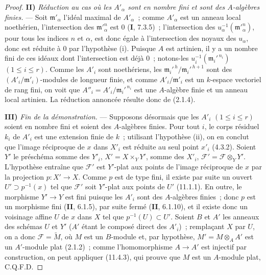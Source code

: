 \begin{proof}
\medskip
\noindent\textbf{II)} \emph{Réduction au cas où les $A'_\alpha$ sont en nombre
fini et sont des $A$-algèbres finies.} --- Soit $\mathfrak m'_\alpha$ l'idéal
maximal de $A'_\alpha$~; comme $A'_\alpha$ est un anneau local noethérien,
l'intersection des $\mathfrak m'^n_\alpha$ est $0$ (\textbf I, 7.3.5)~;
l'intersection des $u_\alpha^{-1}(\mathfrak m'^n_\alpha)$, pour tous les indices
$n$ et $\alpha$, est donc égale à l'intersection des noyaux des $u_\alpha$, donc
est réduite à $0$ par l'hypothèse (i). Puisque $A$ est artinien, il y a un nombre
fini de ces idéaux dont l'intersection est déjà $0$~; notons-les
$u_i^{-1}(\mathfrak m_i'^{\,n_i})$ $(1\leq i\leq r)$. Comme les $A'_i$ sont
noethériens, les $\mathfrak m_i'^{\,h}/\mathfrak m_i'^{\,h+1}$ sont des
$(A'_i/\mathfrak m'_i)$-modules de longueur finie, et comme
$A'_i/\mathfrak m'_i$ est un $k$-espace vectoriel de rang fini, on voit que
$A''_i=A'_i/\mathfrak m_i'^{\,n_i}$ est une $A$-algèbre finie et un anneau local
artinien. La réduction annoncée résulte donc de (2.1.4).

\medskip
\noindent\textbf{III)} \emph{Fin de la démonstration.} --- Supposons désormais
que les $A'_i$ $(1\leq i\leq r)$ soient en nombre fini et soient des
$A$-algèbres finies. Pour tout $i$, le corps résiduel $k_i$ de $A'_i$ est une
extension finie de $k$~; utilisant l'hypothèse (ii), on en conclut que l'image
réciproque de $x$ dans $X'_i$ est réduite au seul point $x'_i$ (4.3.2). Soient
$Y'$ le préschéma somme des $Y'_i$, $X'=X\times_Y Y'$, somme des $X'_i$,
$\mathcal F'=\mathcal F\otimes_Y Y'$. L'hypothèse entraîne que
$\mathcal F'$ est $Y'$-plat aux points de l'image réciproque de $x$ par la
projection $p:X'\to X$. Comme $p$ est de type fini, il existe par suite un
ouvert $U'\supset p^{-1}(x)$ tel que $\mathcal F'$ soit $Y'$-plat aux points de
$U'$ (11.1.1). En outre, le morphisme $Y'\to Y$ est fini puisque les $A'_i$
sont des $A$-algèbres finies~; donc $p$ est un morphisme fini (\textbf{II},
6.1.5), par suite fermé (\textbf{II}, 6.1.10), et il existe donc un voisinage
affine $U$ de $x$ dans $X$ tel que $p^{-1}(U)\subset U'$. Soient $B$ et $A'$
les anneaux des schémas $U$ et $Y'$ ($A'$ étant le composé direct des $A'_i$)~;
remplaçant $X$ par $U$, on a donc $\mathcal F=\widetilde M$, où $M$ est un
$B$-module et, par hypothèse, $M'=M\otimes_A A'$ est un $A'$-module plat
(2.1.2)~; comme l'homomorphisme $A\to A'$ est injectif par construction, on
peut appliquer (11.4.3), qui prouve que $M$ est un $A$-module plat, C.Q.F.D.
\end{proof}

